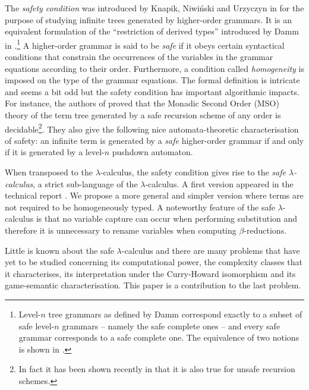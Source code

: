 \documentclass{llncs}
\begin{document}
The \emph{safety condition} was introduced by Knapik, Niwi{\'n}ski and Urzyczyn in \cite{KNU02} for the purpose of studying infinite trees generated by higher-order grammars.
It is an equivalent formulation of the ``restriction of derived types'' introduced by Damm in \cite{Dam82}.\footnote{Level-$n$ tree grammars as defined by Damm correspond exactly to a subset of safe level-$n$ grammars -- namely the safe complete ones -- and every safe grammar corresponds to a safe complete one. The equivalence of two notions is shown in \cite{demirandathesis}.}
A higher-order grammar is said to be \emph{safe} if it obeys certain syntactical conditions that constrain the occurrences of the variables in the grammar equations according to their order. Furthermore, a condition called \emph{homogeneity} is imposed on the type of the grammar equations.
The formal definition is intricate and seems a bit odd but the safety condition has important algorithmic impacts.
For instance, the authors of \cite{KNU02} proved that the Monadic Second Order (MSO) theory of the term tree generated by a safe recursion scheme of any order is decidable\footnote{In fact it has been shown recently in \cite{OngLics2006} that it is also true for unsafe recursion schemes.}. They also give the following nice automata-theoretic characterisation of safety:
an infinite term is generated by a \emph{safe} higher-order grammar if and only if it is generated by a level-$n$ pushdown automaton.


When transposed to the $\lambda$-calculus, the safety condition
gives rise to the \emph{safe $\lambda$-calculus}, a strict
sub-language of the $\lambda$-calculus. A first version appeared in the technical report \cite{safety-mirlong2004}. We propose a more general and simpler version where terms are not required to be homogeneously typed. A noteworthy feature of the safe $\lambda$-calculus is that no variable capture can occur when performing substitution and therefore it is unnecessary to rename variables when computing $\beta$-reductions.

Little is known about the safe $\lambda$-calculus and there are many problems that have yet to be studied concerning its computational power, the complexity classes that it characterises, its interpretation under the Curry-Howard isomorphism and its game-semantic characterisation. This paper is a contribution to the last problem.
\end{document}
